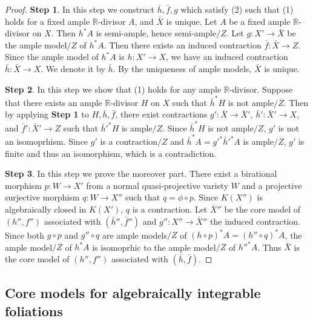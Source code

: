 \documentclass[11pt]{amsart}
\numberwithin{equation}{section}
\newcommand{\Rr}{\mathbb{R}}
\theoremstyle{definition}
\theoremstyle{definition}
\theoremstyle{definition}
\begin{document}
\begin{proof}

\noindent\textbf{Step 1}. In this step we construct $\bar h,\bar f, g$ which satisfy (2) such that (1) holds for a fixed ample $\Rr$-divisor $A$, and $\bar X$ is unique. Let $A$ be a fixed ample $\Rr$-divisor on $X$. Then $h^*A$ is semi-ample, hence semi-ample$/Z$. Let $g: X'\rightarrow\bar X$ be the ample model$/Z$ of $h^*A$. Then there exists an induced contraction $\bar f: \bar X\rightarrow Z$. Since the ample model of $h^*A$ is $h: X'\rightarrow X$, we have an induced contraction $\bar h: \bar X\rightarrow X$. We denote it by $\bar h$. By the uniqueness of ample models, $\bar X$ is unique.

\medskip

\noindent\textbf{Step 2}. In this step we show that (1) holds for any ample $\Rr$-divisor. Suppose that there exists an ample $\Rr$-divisor $H$ on $X$ such that $\bar h^*H$ is not ample$/Z$. Then by applying \textbf{Step 1} to $H,\bar h,\bar f$, there exist contractions $g': \bar X\rightarrow\bar X'$, $\bar h': \bar X'\rightarrow X$, and $\bar f': \bar X'\rightarrow Z$ such that $\bar h'^*H$ is ample$/Z$. Since $\bar h^*H$ is not ample$/Z$, $g'$ is not an isomoprhism. Since $g'$ is a contraction$/Z$ and $\bar h^*A=g'^*\bar h'^*A$ is ample$/Z$, $g'$ is finite and thus an isomorphism, which is a contradiction.

\medskip

\noindent\textbf{Step 3}. In this step we prove the moreover part. There exist a birational morphism $p: W\rightarrow X'$ from a normal quasi-projective variety $W$ and a projective surjective morphism $q: W\rightarrow X''$ such that $q=\phi\circ p$. Since $K(X'')$ is algebraically closed in $K(X')$, $q$ is a contraction. Let $\bar X''$ be the core model of $(h'',f'')$ associated with $(\bar h'',\bar f'')$ and $g'': X''\rightarrow\bar X''$ the induced contraction. Since both $g\circ p$ and $g''\circ q$ are ample models$/Z$ of  $(h\circ p)^*A=(h''\circ q)^*A$, the ample model$/Z$ of $h^*A$ is isomoprhic to the ample model$/Z$ of $h''^*A$. Thus $\bar X$ is the core model of $(h'',f'')$ associated with $(\bar h,\bar f)$.
\end{proof}


\subsection{Core models for algebraically integrable foliations}
\end{document}
